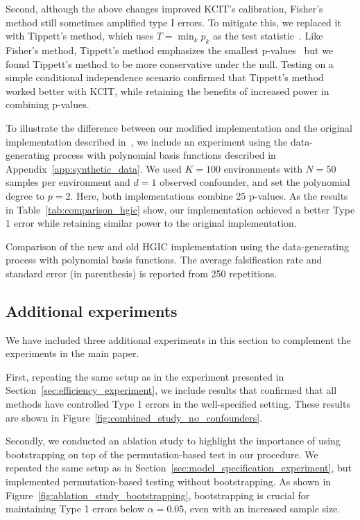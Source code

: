 \documentclass{article}
\begin{document}
Second, although the above changes improved KCIT’s calibration, Fisher's method still sometimes amplified type I errors. To mitigate this, we replaced it with Tippett's method, which uses $T=\min_k p_k$ as the test statistic~\citep{tippett1931methods}. Like Fisher's method, Tippett's method emphasizes the smallest p-values~\citep{heard2018choosing} but we found Tippett's method to be more conservative under the null. Testing on a simple conditional independence scenario confirmed that Tippett's method worked better with KCIT, while retaining the benefits of increased power in combining p-values.

To illustrate the difference between our modified implementation and the original implementation described in~\citet{karlsson2023detecting}, we include an experiment using the data-generating process with polynomial basis functions described in Appendix~\ref{app:synthetic_data}. We used $K=100$ environments with $N=50$ samples per environment and $d=1$ observed confounder, and set the polynomial degree to $p=2$. Here, both implementations combine 25 p-values. As the results in Table~\ref{tab:comparison_hgic} show, our implementation achieved a better Type 1 error while retaining similar power to the original implementation.

\begin{table}[t]
    \centering
    \caption{Comparison of the new and old  HGIC implementation using the data-generating process with polynomial basis functions. The average falsification rate and standard error (in parenthesis) is reported from 250 repetitions.}
    \label{tab:comparison_hgic}
    
\end{table}

\subsection{Additional experiments}\label{app:additional_experiments}

We have included three additional experiments in this section to complement the experiments in the main paper. 

First, repeating the same setup as in the experiment presented in Section~\ref{sec:efficiency_experiment}, we include results that confirmed that all methods have controlled Type 1 errors in the well-specified setting. These results are shown in Figure~\ref{fig:combined_study_no_confounders}.

Secondly, we conducted an ablation study to highlight the importance of using bootstrapping on top of the permutation-based test in our procedure. We repeated the same setup as in Section~\ref{sec:model_specification_experiment}, but implemented permutation-based testing without bootstrapping.  As shown in Figure~\ref{fig:ablation_study_bootstrapping}, bootstrapping is crucial for maintaining Type 1 errors below $\alpha=0.05$, even with an increased sample size.
\end{document}
